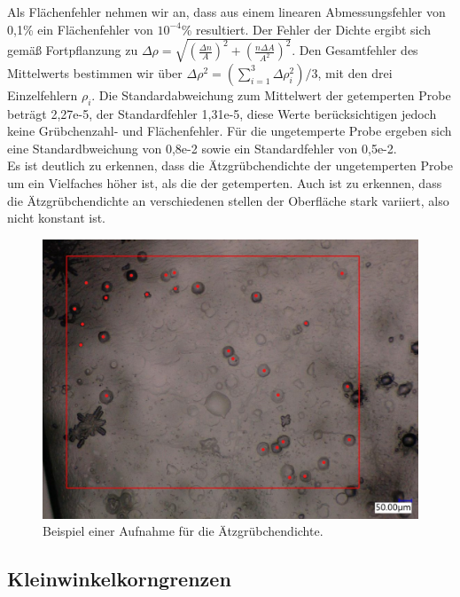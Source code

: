 	Als Flächenfehler nehmen wir an, dass aus einem linearen Abmessungsfehler von 0,1\% ein Flächenfehler von $10^{-4}$\% resultiert.
	Der Fehler der Dichte ergibt sich gemäß Fortpflanzung zu $\Delta \rho = \sqrt{(\frac{\Delta n}{A})^2 + (\frac{n\Delta A}{A^2})^2}$.
	Den Gesamtfehler des Mittelwerts bestimmen wir über $\Delta \rho^2 = (\sum_{i=1}^3 \Delta \rho_i^2)/3$, mit den drei Einzelfehlern $\rho_i$. Die Standardabweichung zum Mittelwert der getemperten Probe beträgt 2,27e-5, der Standardfehler 1,31e-5, diese Werte berücksichtigen jedoch keine Grübchenzahl- und Flächenfehler. Für die ungetemperte Probe ergeben sich eine Standardbweichung von 0,8e-2 sowie ein Standardfehler von 0,5e-2.\\
        Es ist deutlich zu erkennen, dass die Ätzgrübchendichte der ungetemperten Probe um ein Vielfaches höher ist, als die der getemperten.
        Auch ist zu erkennen, dass die Ätzgrübchendichte an verschiedenen stellen der Oberfläche stark variiert, also nicht konstant ist.
    \begin{figure}[H]
        \centering
        \includegraphics[width=\textwidth]{Images/Beispiel_ätzgrübchendichte.PNG}
        \caption{Beispiel einer Aufnahme für die Ätzgrübchendichte.}
    \end{figure}

    \subsection{Kleinwinkelkorngrenzen}
